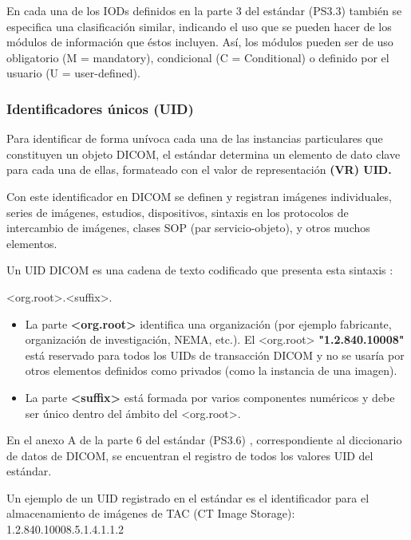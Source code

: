 En cada una de los IODs definidos en la parte 3 del estándar (PS3.3) \cite{13} también se especifica una clasificación similar, indicando el uso que se pueden hacer de los módulos de información que éstos incluyen. Así, los módulos pueden ser de uso obligatorio (M = mandatory), condicional (C = Conditional) o definido por el usuario (U = user-defined).

\subsubsection{Identificadores únicos (UID)}
Para identificar de forma unívoca cada una de las instancias particulares que constituyen un objeto DICOM, el estándar determina un elemento de dato clave para cada una de ellas, formateado con el valor de representación \textbf{(VR) UID.}

Con este identificador en DICOM se definen y registran imágenes individuales, series de imágenes, estudios, dispositivos, sintaxis en los protocolos de intercambio de imágenes, clases SOP (par servicio-objeto), y otros muchos elementos. 

Un UID DICOM es una cadena de texto codificado que presenta esta sintaxis \cite{15}:
\begin{listing}[
	float=ht,
	lenguage = marcas,
	caption = {},
	label = code:org_suffix]
	<org.root>.<suffix>.
\end{listing}

\begin{itemize}
\item La parte \textbf{<org.root>} identifica una organización (por ejemplo fabricante, organización de investigación, NEMA, etc.). El <org.root> \textbf{"1.2.840.10008"} está reservado para todos los UIDs de transacción DICOM y no se usaría por otros elementos definidos como privados (como la instancia de una imagen).

\item La parte \textbf{<suffix>} está formada por varios componentes numéricos y debe ser único dentro del ámbito del <org.root>.
\end{itemize}

En el anexo A de la parte 6 del estándar (PS3.6) \cite{14}, correspondiente al diccionario de datos de DICOM, se encuentran el registro de todos los valores UID del estándar.

Un ejemplo de un UID registrado en el estándar es el identificador para el almacenamiento de imágenes de TAC (CT Image Storage): 1.2.840.10008.5.1.4.1.1.2 

